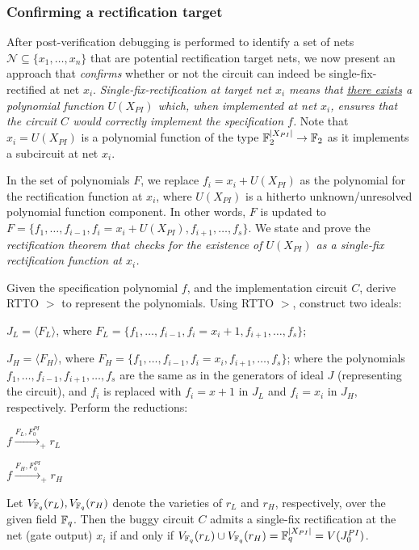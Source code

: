 \subsubsection{Confirming a rectification target} 
After post-verification debugging is performed to identify a set of
nets $\mathcal{N}\subseteq \{x_1,\dots,x_n\}$ that are potential
rectification target nets, we now present an approach that {\it confirms}
whether or not the circuit can indeed be single-fix-rectified at net
$x_i$. {\it Single-fix-rectification at target net $x_i$ means that
  \underline{there exists} a polynomial function $U(X_{PI})$ which,
  when implemented at net $x_i$, ensures that the circuit $C$ would
  correctly implement the specification $f$.} Note that
$x_i=U(X_{PI})$ is a polynomial function of the type
${\mathbb{F}}_2^{|X_{PI}|}\rightarrow{\mathbb{F}}_2$ as it implements a subcircuit at net $x_i$.

In the set of polynomials $F$, we replace $f_i = x_i+U(X_{PI})$ as the
polynomial for the rectification function at $x_i$, where $U(X_{PI})$
is a hitherto unknown/unresolved polynomial function component. In
other words, $F$ is updated to $F = \{f_1,\dots, f_{i-1}, f_i=
x_i+U(X_{PI}),f_{i+1},\dots,f_s\}$.  We state and prove the 
{\it rectification theorem that checks for the existence of
  $U(X_{PI})$ as a single-fix rectification function at $x_i$.}

\begin{Theorem}
Given the specification polynomial $f$, and the implementation circuit
$C$, derive RTTO $>$ to represent the polynomials. Using RTTO $>$,
construct two ideals:  
\bi
\item $J_L = \langle F_L\rangle$, where
  $F_L=\{f_1,\dots,f_{i-1},f_i=x_i+1,f_{i+1},\dots,f_s\}$;
\item $J_H = \langle F_H\rangle$, where
  $F_H=\{f_1,\dots,f_{i-1},f_i=x_i,f_{i+1},\dots,f_s\}$;
\ei
where the polynomials $f_1,\dots,f_{i-1},f_{i+1},\dots,f_s$ are the
same as in the generators of ideal $J$ (representing the circuit), and
$f_i$ is replaced with $f_i = x+1$ in $J_L$ and $f_i = x_i$ in $J_H$,
respectively. Perform the reductions: 
\bi
\item $f\xrightarrow{F_L, F_{0}^{PI}}_+r_L $
\item $f\xrightarrow{F_H,F_{0}^{PI}}_+r_H $
\ei

Let $V_{{\mathbb{F}}_{q}}(r_L), V_{{\mathbb{F}}_{q}}(r_H)$ denote the varieties of $r_L$ and
$r_H$, respectively, over the given field ${\mathbb{F}}_{q}$. Then the buggy
circuit $C$ admits a single-fix rectification at the net (gate 
output) $x_i$ if and only if $V_{{\mathbb{F}}_{q}}(r_L) \cup V_{{\mathbb{F}}_{q}}(r_H) =
{\mathbb{F}}_{q}^{|X_{PI}|} = V(J_0^{PI})$.
\end{Theorem}

